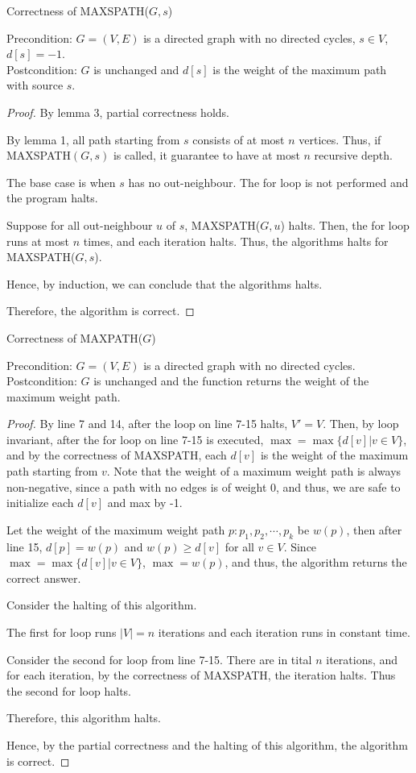 \documentclass[10pt]{article}
\begin{document}
Correctness of MAXSPATH($G,s$)

Precondition: $G=(V,E)$ is a directed graph with no directed cycles, $s \in V$,
$d[s] = -1$. \\
Postcondition: $G$ is unchanged and $d[s]$ is the weight of the maximum path
with source $s$.

\begin{proof}
	By lemma 3, partial correctness holds.

	By lemma 1, all path starting from $s$ consists of at most $n$ vertices. 
	Thus, if MAXSPATH$(G, s)$ is called, it guarantee to have at most $n$
	recursive depth. 

	The base case is when $s$ has no out-neighbour.
	The for loop is not performed and the program halts.

	Suppose for all out-neighbour $u$ of $s$, MAXSPATH($G,u$) halts.
	Then, the for loop runs at most $n$ times, and each iteration halts. 
	Thus, the algorithms halts for MAXSPATH($G,s$).

	Hence, by induction, we can conclude that the algorithms halts.

	Therefore, the algorithm is correct.
\end{proof}

Correctness of MAXPATH($G$)

Precondition: $G=(V,E)$ is a directed graph with no directed cycles. \\
Postcondition: $G$ is unchanged and the function returns the weight of the
maximum weight path.

\begin{proof}
	By line 7 and 14, after the loop on line 7-15 halts, $V' = V$.
	Then, by loop invariant, after the for loop on line 7-15 is executed, $\max
	= \max\{d[v] | v \in V\}$, and by the correctness of MAXSPATH, each
	$d[v]$ is the weight of the maximum path starting from $v$. 
	Note that the weight of a maximum weight path is always non-negative, since
	a path with no edges is of weight 0, and thus, we are safe to initialize
	each $d[v]$ and max by -1. 

	Let the weight of the maximum weight path $p: p_1, p_2, \cdots, p_k$ be
	$w(p)$, then after line 15, $d[p] = w(p)$ and $w(p) \geq d[v]$ for all $v
	\in V$. 
	Since $\max = \max\{d[v] | v \in V\}$, $\max = w(p)$, and thus, the
	algorithm returns the correct answer. 

	Consider the halting of this algorithm.

	The first for loop runs $|V| = n$ iterations and each iteration runs in
	constant time.
	
	Consider the second for loop from line 7-15. 
	There are in tital $n$ iterations, and for each iteration, by the
	correctness of MAXSPATH, the iteration halts.
	Thus the second for loop halts. 

	Therefore, this algorithm halts. 

	Hence, by the partial correctness and the halting of this algorithm, the
	algorithm is correct.
\end{proof}
\end{document}
